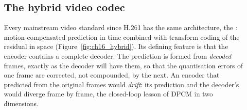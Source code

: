 \subsection{The hybrid video codec}

Every mainstream video standard since H.261 has the same architecture, the :
motion-compensated prediction in time combined with transform coding of the residual in space
(Figure~\ref{fig:ch16_hybrid}). Its defining feature is that the encoder contains a complete decoder.
The prediction is formed from \emph{decoded} frames, exactly as the decoder will have them, so that the
quantisation errors of one frame are corrected, not compounded, by the next. An encoder that predicted
from the original frames would \emph{drift}: its prediction and the decoder's would diverge frame by
frame, the closed-loop lesson of DPCM in two dimensions.

